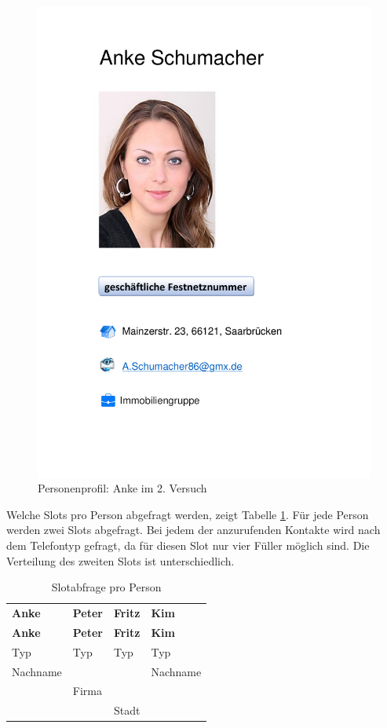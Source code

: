 \documentclass[12pt,a4paper]{scrartcl}
\begin{document}
\begin{figure}[H]
\begin{center}
\includegraphics[width=12cm]{Anke2.pdf}
\caption{Personenprofil: Anke im 2. Versuch}
\label{anke2}
\end{center}
\end{figure}

Welche Slots pro Person abgefragt werden, zeigt Tabelle \ref{slotsPerson2}. 
Für jede Person werden zwei Slots abgefragt. Bei jedem der anzurufenden Kontakte wird nach dem Telefontyp gefragt, da für diesen Slot nur vier Füller möglich sind. Die Verteilung des zweiten Slots ist unterschiedlich.

\begin{longtable}{p{}p{}p{}p{}}
	\label{slotsPerson2}\\
	\caption[Slotabfrage pro Person]{Slotabfrage pro Person}\\
	\hline
	\textbf{Anke}&\textbf{Peter}&\textbf{Fritz} &\textbf{Kim}\\
	\hline
	\endfirsthead
	\hline
	\textbf{Anke}&\textbf{Peter}&\textbf{Fritz} &\textbf{Kim}\\
	\hline
	\endhead
Typ & Typ & Typ & Typ\\
Nachname & & & Nachname \\
& Firma & & \\
& & Stadt & \\

\hline
\end{longtable}
\end{document}
